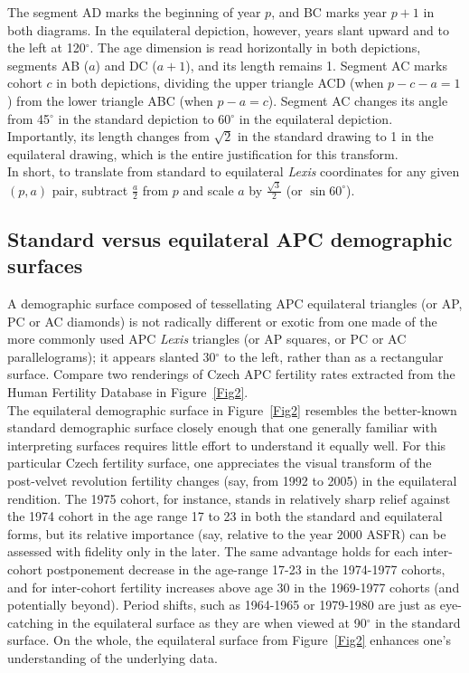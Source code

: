 \documentclass[a4paper]{article}
\begin{document}
The segment AD marks the beginning of year $p$, and BC marks year $p+1$ in both diagrams. In the equilateral depiction, however, years slant upward and to the left at 120$^\circ$. The age dimension is read horizontally in both depictions, segments AB ($a$) and DC ($a+1$), and its length remains 1. Segment AC marks cohort $c$ in both depictions, dividing the upper triangle ACD (when $p-c-a=1$) from the lower triangle ABC (when $p-a=c$). Segment AC changes its angle from 45$^\circ$ in the standard depiction to 60$^\circ$ in the equilateral depiction. Importantly, its length changes from $\sqrt{2}$ in the standard drawing to 1 in the equilateral drawing, which is the entire justification for this transform.\\ 

In short, to translate from standard to equilateral \textit{Lexis} coordinates for any given $(p,a)$ pair, subtract $\frac{a}{2}$ from $p$ and scale $a$ by $\frac{\sqrt{3}}{2}$ (or $\sin{60^\circ}$).

\subsection*{Standard versus equilateral APC demographic surfaces}
A demographic surface composed of tessellating APC equilateral triangles (or AP, PC or AC diamonds) is not radically different or exotic from one made of the more commonly used APC \textit{Lexis} triangles (or AP squares, or PC or AC parallelograms); it appears slanted 30$^\circ$ to the left, rather than as a rectangular surface. Compare two renderings of Czech APC fertility rates extracted from the Human Fertility Database  in Figure~\ref{Fig2}.\\

The equilateral demographic surface in Figure~\ref{Fig2} resembles the better-known standard demographic surface closely enough that one generally familiar with interpreting surfaces requires little effort to understand it equally well. For this particular Czech fertility surface, one appreciates the visual transform of the post-velvet revolution fertility changes (say, from 1992 to 2005) in the equilateral rendition. The 1975 cohort, for instance, stands  in relatively sharp relief against the 1974 cohort in the age range 17 to 23 in both the standard and equilateral forms, but its relative importance (say, relative to the year 2000 ASFR) can be assessed with fidelity only in the later. The same advantage holds for each inter-cohort postponement decrease in the age-range 17-23 in the 1974-1977 cohorts, and for inter-cohort fertility increases above age 30 in the 1969-1977 cohorts (and potentially beyond). Period shifts, such as 1964-1965 or 1979-1980 are just as eye-catching in the equilateral surface as they are when viewed at 90$^\circ$ in the standard surface. On the whole, the equilateral surface from Figure~\ref{Fig2} enhances one's understanding of the underlying data.
\end{document}
